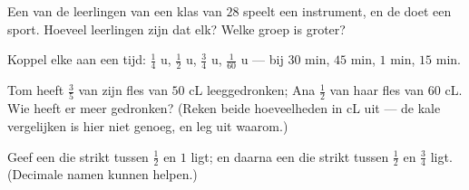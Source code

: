 \begin{exercise}[$\star$]\label{exo:g5:fractions:8}
Een  van de leerlingen van een klas van $28$ speelt een instrument, en
de  doet een sport. Hoeveel leerlingen zijn dat elk? Welke groep is
groter?
\end{exercise}

\begin{exercise}[$\star$]\label{exo:g5:fractions:9}
Koppel elke  aan een tijd: $\frac14$ u, $\frac12$ u, $\frac34$ u,
$\frac{1}{60}$ u --- bij $30$ min, $45$ min, $1$ min, $15$ min.
\end{exercise}

\begin{exercise}[$\star\star$]\label{exo:g5:fractions:10}
Tom heeft $\frac35$ van zijn fles van $50$ cL leeggedronken; Ana $\frac12$
van haar fles van $60$ cL. Wie heeft er meer gedronken? (Reken beide
hoeveelheden in cL uit --- de kale  vergelijken is hier niet genoeg,
en leg uit waarom.)
\end{exercise}

\begin{exercise}[$\star\star$]\label{exo:g5:fractions:11}
Geef een  die strikt tussen $\frac12$ en $1$ ligt; en daarna een die
strikt tussen $\frac12$ en $\frac34$ ligt. (Decimale namen kunnen helpen.)
\end{exercise}
